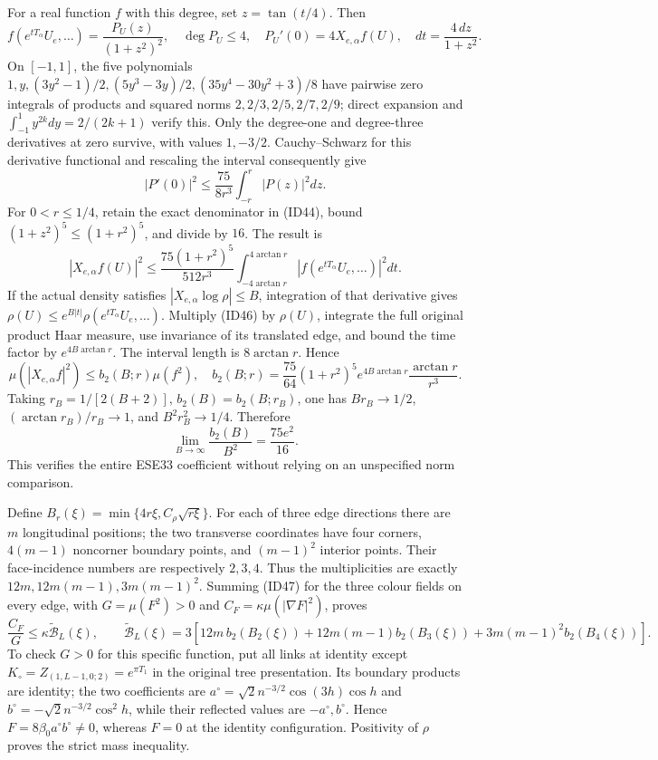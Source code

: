 \documentclass[11pt]{article}
\begin{document}
For a real function \(f\) with this degree, set \(z=\tan(t/4)\). Then
\[
 f(e^{tT_\alpha}U_e,\ldots)=\frac{P_U(z)}{(1+z^2)^2},\quad
 \deg P_U\le4,\quad P_U'(0)=4X_{e,\alpha}f(U),\quad dt=\frac{4\,dz}{1+z^2}.
 \tag{ID44}
\]
On \([-1,1]\), the five polynomials \(1,y,(3y^2-1)/2,(5y^3-3y)/2,(35y^4-30y^2+3)/8\) have pairwise zero integrals of products and squared norms \(2,2/3,2/5,2/7,2/9\); direct expansion and \(\int_{-1}^1y^{2k}dy=2/(2k+1)\) verify this. Only the degree-one and degree-three derivatives at zero survive, with values \(1,-3/2\). Cauchy–Schwarz for this derivative functional and rescaling the interval consequently give
\[
 |P'(0)|^2\le\frac{75}{8r^3}\int_{-r}^r|P(z)|^2dz.
 \tag{ID45}
\]
For \(0<r\le1/4\), retain the exact denominator in (ID44), bound \((1+z^2)^5\le(1+r^2)^5\), and divide by \(16\). The result is
\[
 |X_{e,\alpha}f(U)|^2
 \le\frac{75(1+r^2)^5}{512r^3}
        \int_{-4\arctan r}^{4\arctan r}|f(e^{tT_\alpha}U_e,\ldots)|^2dt.
 \tag{ID46}
\]
If the actual density satisfies \(|X_{e,\alpha}\log\rho|\le B\), integration of that derivative gives \(\rho(U)\le e^{B|t|}\rho(e^{tT_\alpha}U_e,\ldots)\). Multiply (ID46) by \(\rho(U)\), integrate the full original product Haar measure, use invariance of its translated edge, and bound the time factor by \(e^{4B\arctan r}\). The interval length is \(8\arctan r\). Hence
\[
 \mu(|X_{e,\alpha}f|^2)\le b_2(B;r)\mu(f^2),\quad
 b_2(B;r)=\frac{75}{64}(1+r^2)^5e^{4B\arctan r}\frac{\arctan r}{r^3}.
 \tag{ID47}
\]
Taking \(r_B=1/[2(B+2)]\), \(b_2(B)=b_2(B;r_B)\), one has \(Br_B\to1/2\), \((\arctan r_B)/r_B\to1\), and \(B^2r_B^2\to1/4\). Therefore
\[
 \lim_{B\to\infty}\frac{b_2(B)}{B^2}=\frac{75e^2}{16}.
 \tag{ID48}
\]
This verifies the entire ESE33 coefficient without relying on an unspecified norm comparison.

Define \(B_r(\xi)=\min\{4r\xi,C_\rho\sqrt{r\xi}\}\). For each of three edge directions there are \(m\) longitudinal positions; the two transverse coordinates have four corners, \(4(m-1)\) noncorner boundary points, and \((m-1)^2\) interior points. Their face-incidence numbers are respectively \(2,3,4\). Thus the multiplicities are exactly \(12m,12m(m-1),3m(m-1)^2\). Summing (ID47) for the three colour fields on every edge, with \(G=\mu(F^2)>0\) and \(C_F=\kappa\mu(|\nabla F|^2)\), proves
\[
 \frac{C_F}{G}\le\kappa\widetilde{\mathcal B}_L(\xi),\qquad
 \widetilde{\mathcal B}_L(\xi)
 =3[12m\,b_2(B_2(\xi))+12m(m-1)b_2(B_3(\xi))
                            +3m(m-1)^2b_2(B_4(\xi))].
 \tag{ID49}
\]
To check \(G>0\) for this specific function, put all links at identity except \(K_\circ=Z_{(1,L-1,0;2)}=e^{\pi T_1}\) in the original tree presentation. Its boundary products are identity; the two coefficients are \(a^\circ=\sqrt2n^{-3/2}\cos(3h)\cos h\) and \(b^\circ=-\sqrt2n^{-3/2}\cos^2h\), while their reflected values are \(-a^\circ,b^\circ\). Hence \(F=8\beta_0a^\circ b^\circ\ne0\), whereas \(F=0\) at the identity configuration. Positivity of \(\rho\) proves the strict mass inequality.
\end{document}
